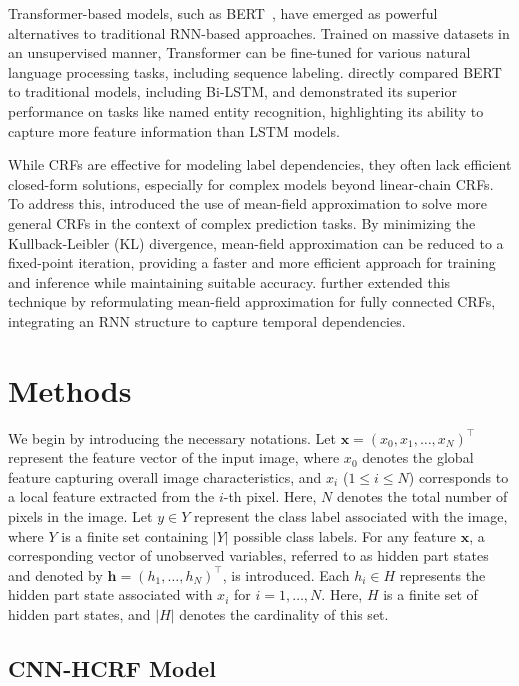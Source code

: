 \documentclass[conference]{IEEEtran}
\newcommand{\hb}{\mathbf{h}}
\newcommand{\xb}{\mathbf{x}}
\begin{document}
Transformer-based models, such as BERT~\citep{devlin2019bert},
have emerged as powerful alternatives to traditional RNN-based approaches.
Trained on massive datasets in an unsupervised manner, Transformer can be
fine-tuned for various natural language processing tasks,
including sequence labeling.
\citet{devlin2019bert} directly compared BERT to traditional models, including
Bi-LSTM, and demonstrated its superior performance on tasks like named entity
recognition, highlighting its ability to capture more feature information
than LSTM models.


While CRFs are effective for modeling label dependencies, they often lack
efficient closed-form solutions, especially for complex models beyond
linear-chain CRFs. To address this, \citet{krahenbuhl2011efficient} introduced
the use of mean-field approximation to solve more general CRFs in the context
of complex prediction tasks. By minimizing the Kullback-Leibler (KL)
divergence, mean-field approximation can be reduced to a fixed-point iteration,
providing a faster and more efficient approach for training and inference
while maintaining suitable accuracy. \citet{zheng2015conditional} further
extended this technique by reformulating mean-field approximation for fully
connected CRFs, integrating an RNN structure to capture temporal dependencies.


\section{Methods}


We begin by introducing the necessary notations.
Let $\xb = (x_0, x_1, \dots, x_N)^\top$ represent the feature vector of the
input image, where $x_0$ denotes the global feature capturing overall image
characteristics, and $x_i$ ($1 \leq i \leq N$) corresponds to a local feature
extracted from the $i$-th pixel. Here, $N$ denotes the total number of pixels
in the image. Let $y \in Y$ represent the class label associated with the image,
where $Y$ is a finite set containing $\vert Y \vert$ possible class labels.
For any feature $\xb$, a corresponding vector of unobserved variables, referred
to as hidden part states and denoted by $\hb = (h_1, \dots, h_N)^\top$,
is introduced. Each $h_i \in H$ represents the hidden part state associated
with $x_i$ for $i = 1, \dots, N$. Here, $H$ is a finite set of hidden part
states, and $\vert H \vert$ denotes the cardinality of this set.


\subsection{CNN-HCRF Model}
\end{document}
